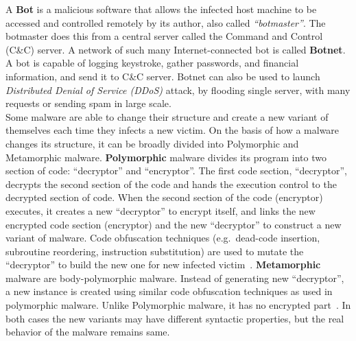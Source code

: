 A \textbf{Bot} is a malicious software that allows the infected host machine to be accessed and controlled remotely by its author, also called \emph{``botmaster''}.
The botmaster does this from a central server called the Command and Control (C\&C) server.
A network of such many Internet-connected bot is called \textbf{Botnet}.
A bot is capable of logging keystroke, gather passwords, and financial information, and send it to C\&C server.
Botnet can also be used to launch \emph{Distributed Denial of Service (DDoS)} attack, by flooding single server, with many requests or sending spam in large scale.\\
Some malware are able to change their structure and create a new variant of themselves each time they infects a new victim.
On the basis of how a malware changes its structure, it can be broadly divided into Polymorphic and Metamorphic malware.
\textbf{Polymorphic} malware divides its program into two section of code: ``decryptor'' and ``encryptor''.
The first code section, ``decryptor'', decrypts the second section of the code and hands the execution control to the decrypted section of code.
When the second section of the code (encryptor) executes, it creates a new ``decryptor'' to encrypt itself, and links the new encrypted code section (encryptor) and the new ``decryptor'' to construct a new variant of malware.
Code obfuscation techniques (e.g.\ dead-code insertion, subroutine reordering, instruction substitution) are used to mutate the ``decryptor'' to build the new one for new infected victim~\cite[]{rad2011evolution}.
\textbf{Metamorphic} malware are body-polymorphic malware.
Instead of generating new ``decryptor'', a new instance is created using similar code obfuscation techniques as used in polymorphic malware.
Unlike Polymorphic malware, it has no encrypted part~\cite[]{rad2012camouflage}.
In both cases the new variants may have different syntactic properties, but the real behavior of the malware remains same.\\

